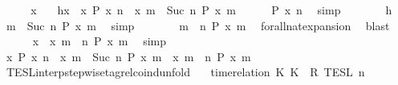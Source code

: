 \begin{isabellebody}
\isanewline
{}\isamarkupfalse%
\isanewline
\ \ \isacommand{{\isacharbraceleft}}\isamarkupfalse%
\ \isamarkupfalse%
\ x\ \ \isamarkupfalse%
\ h{\isacharcolon}{\isacartoucheopen}x\ {\isasymin}\ {\isacharbraceleft}x{\isachardot}\ P\ x\ n{\isacharbraceright}\ {\isasyminter}\ {\isacharbraceleft}x{\isachardot}\ {\isasymforall}m\ {\isasymge}\ Suc\ n{\isachardot}\ P\ x\ m{\isacharbraceright}{\isacartoucheclose}\isanewline
\ \ \ \ \isamarkupfalse%
\ {\isacartoucheopen}P\ x\ n{\isacartoucheclose}\ \isamarkupfalse%
\ simp\isanewline
\ \ \ \ \isamarkupfalse%
\ \isamarkupfalse%
\ h\ \isamarkupfalse%
\ {\isacartoucheopen}{\isasymforall}m\ {\isasymge}\ Suc\ n{\isachardot}\ P\ x\ m{\isacartoucheclose}\ \isamarkupfalse%
\ simp\isanewline
\ \ \ \ \isamarkupfalse%
\ \isamarkupfalse%
\ {\isacartoucheopen}{\isasymforall}m\ {\isasymge}\ n{\isachardot}\ P\ x\ m{\isacartoucheclose}\ \isamarkupfalse%
\ forall{\isacharunderscore}nat{\isacharunderscore}expansion\ \isamarkupfalse%
\ blast\isanewline
\ \ \ \ \isamarkupfalse%
\ {\isacartoucheopen}x\ {\isasymin}\ {\isacharbraceleft}x{\isachardot}\ {\isasymforall}m\ {\isasymge}\ n{\isachardot}\ P\ x\ m{\isacharbraceright}{\isacartoucheclose}\ \isamarkupfalse%
\ simp\isanewline
\ \ \isacommand{{\isacharbraceright}}\isamarkupfalse%
\ \isamarkupfalse%
\ {\isacartoucheopen}{\isacharbraceleft}x{\isachardot}\ P\ x\ n{\isacharbraceright}\ {\isasyminter}\ {\isacharbraceleft}x{\isachardot}\ {\isasymforall}m\ {\isasymge}\ Suc\ n{\isachardot}\ P\ x\ m{\isacharbraceright}\ {\isasymsubseteq}\ {\isacharbraceleft}x{\isachardot}\ {\isasymforall}m\ {\isasymge}\ n{\isachardot}\ P\ x\ m{\isacharbraceright}{\isacartoucheclose}\ \isacommand{{\isachardot}{\isachardot}}\isamarkupfalse%
\isanewline
{}\isamarkupfalse%
%
\endisatagproof
{\isafoldproof}%
%
\isadelimproof
\isanewline
%
\endisadelimproof
\isanewline
{}\isamarkupfalse%
\ TESL{\isacharunderscore}interp{\isacharunderscore}stepwise{\isacharunderscore}tagrel{\isacharunderscore}coind{\isacharunderscore}unfold{\isacharcolon}\isanewline
\ \ {\isacartoucheopen}{\isasymlbrakk}\ time{\isacharminus}relation\ {\isasymlfloor}K\ K\ {\isasymin}\ R\ {\isasymrbrakk}\isactrlsub T\isactrlsub E\isactrlsub S\isactrlsub L\isactrlbsup {\isasymge}\ n\isactrlesup \ {\isacharequal}\isanewline

\end{isabellebody}
